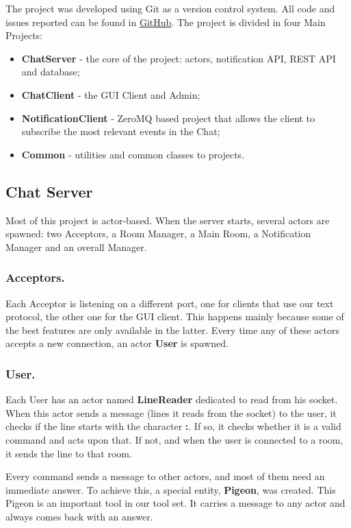 
The project was developed using Git as a version control system. All code and issues reported can be found in \href{https://github.com/VolatileSD/ChatServer}{GitHub}. The project is divided in four Main Projects:\\
\begin{itemize}
\item \textbf{ChatServer} - the core of the project: actors, notification API, REST API and database;
\item \textbf{ChatClient} - the GUI Client and Admin;
\item \textbf{NotificationClient} - ZeroMQ based project that allows the client to subscribe the most relevant events in the Chat;
\item \textbf{Common} - utilities and common classes to projects.
\end{itemize}

\subsection{Chat Server}
Most of this project is actor-based. When the server starts, several actors are spawned: two Acceptors, a Room Manager, a Main Room, a Notification Manager and an overall Manager.

\subsubsection{Acceptors.} Each Acceptor is listening on a different port, one for clients that use our text protocol, the other one for the GUI client. This happens mainly because some of the best features are only available in the latter. Every time any of these actors accepts a new connection, an actor \textbf{User} is spawned.

\subsubsection{User.} Each User has an actor named \textbf{LineReader} dedicated to read from his socket. When this actor sends a message (lines it reads from the socket) to the user, it checks if the line starts with the character \textbf{:}. If so, it  checks whether it is a valid command and acts upon that. If not, and when the user is connected to a room, it sends the line to that room.

Every command sends a message to other actors, and most of them need an immediate answer. To achieve this, a special entity, \textbf{Pigeon}, was created. This Pigeon is an important tool in our tool set. It carries a message to any actor and always comes back with an answer.

